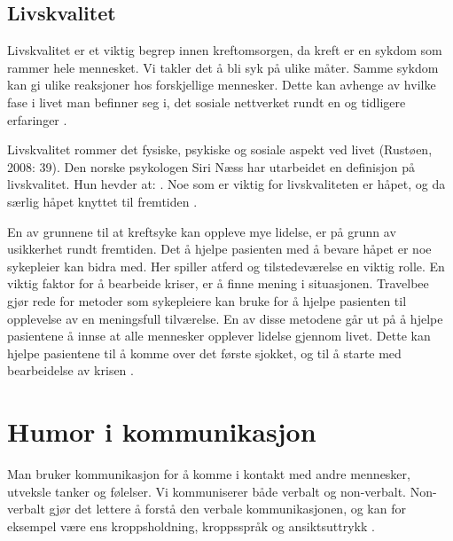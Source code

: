 \subsection{Livskvalitet}

Livskvalitet er et viktig begrep innen kreftomsorgen, da kreft er en sykdom som
rammer hele mennesket. Vi takler det å bli syk på ulike måter. Samme sykdom kan
gi ulike reaksjoner hos forskjellige mennesker. Dette kan avhenge av hvilke
fase i livet man befinner seg i, det sosiale nettverket rundt en og tidligere
erfaringer \cite[s.~39]{rustoen2008}.

Livskvalitet rommer det fysiske, psykiske og sosiale aspekt ved livet (Rustøen,
2008: 39). Den norske psykologen Siri Næss har utarbeidet en definisjon på
livskvalitet. Hun hevder at: . Noe som er viktig for livskvaliteten
er håpet, og da særlig håpet knyttet til fremtiden \cite[s.~40]{rustoen2008}.

En av grunnene til at kreftsyke kan oppleve mye lidelse, er på grunn av
usikkerhet rundt fremtiden. Det å hjelpe pasienten med å bevare håpet er noe
sykepleier kan bidra med. Her spiller atferd og tilstedeværelse en viktig
rolle. En viktig faktor for å bearbeide kriser, er å finne mening i
situasjonen. Travelbee gjør rede for metoder som sykepleiere kan bruke for å
hjelpe pasienten til opplevelse av en meningsfull tilværelse. En av disse
metodene går ut på å hjelpe pasientene å innse at alle mennesker opplever
lidelse gjennom livet. Dette kan hjelpe pasientene til å komme over det første
sjokket, og til å starte med bearbeidelse av krisen
\cite[s.~40--42]{rustoen2008}.

\section{Humor i kommunikasjon}

Man bruker kommunikasjon for å komme i kontakt med andre mennesker, utveksle
tanker og følelser. Vi kommuniserer både verbalt og non-verbalt. Non-verbalt
gjør det lettere å forstå den verbale kommunikasjonen, og kan for eksempel være
ens kroppsholdning, kroppsspråk og ansiktsuttrykk
\cite[s.~65--67]{reitan2008.kommunikasjon}.

